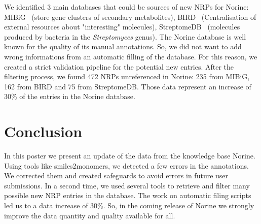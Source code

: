 \documentclass[poster, final]{jobim2017}
\begin{document}
We identified 3 main databases that could be sources of new NRPs for Norine: MIBiG~\cite{_mibig:_????} (store gene clusters of secondary metabolites),
BIRD~\cite{berman_announcing_2003} (Centralisation of external resources about "interesting" molecules),
StreptomeDB~\cite{lucas_streptomedb:_2013} (molecules produced by bacteria in the \textit{Streptomyces} genus).
The Norine database is well known for the quality of its manual annotations.
So, we did not want to add wrong informations from an automatic filling of the database.
For this reason, we created a strict validation pipeline for the potential new entries.
After the filtering process, we found 472 NRPs unreferenced in Norine: 235 from MIBiG, 162 from BIRD and 75 from StreptomeDB.
Those data represent an increase of 30\% of the entries in the Norine database.

\section{Conclusion}

In this poster we present an update of the data from the knowledge base Norine.
Using tools like smiles2monomers, we detected a few errors in the annotations.
We corrected them and created safeguards to avoid errors in future user submissions.
In a second time, we used several tools to retrieve and filter many possible new NRP entries in the database.
The work on automatic filing scripts led us to a data increase of 30\%.
So, in the coming release of Norine we strongly improve the data quantity and quality available for all.



 
\end{document}
